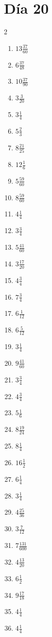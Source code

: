 \documentclass[12pt]{article}
\begin{document}
\section*{Día 20}
\begin{multicols}{2}\begin{enumerate}
\item $ 13 \frac{37}{60} $
\item $ 6 \frac{37}{48} $
\item $ 10 \frac{37}{90} $
\item $ 3 \frac{3}{20} $
\item $ 3 \frac{1}{4} $
\item $ 5 \frac{2}{3} $
\item $ 8 \frac{21}{25} $
\item $ 12 \frac{1}{6} $
\item $ 5 \frac{59}{60} $
\item $ 8 \frac{59}{60} $
\item $ 4 \frac{1}{4} $
\item $ 3 \frac{3}{4} $
\item $ 5 \frac{41}{60} $
\item $ 3 \frac{17}{20} $
\item $ 4 \frac{3}{4} $
\item $ 7 \frac{3}{4} $
\item $ 6 \frac{1}{12} $
\item $ 6 \frac{5}{12} $
\item $ 3 \frac{1}{4} $
\item $ 9 \frac{41}{60} $
\item $ 3 \frac{3}{4} $
\item $ 4 \frac{3}{4} $
\item $ 5 \frac{1}{6} $
\item $ 8 \frac{19}{24} $
\item $ 8 \frac{1}{4} $
\item $ 16 \frac{1}{2} $
\item $ 6 \frac{1}{4} $
\item $ 3 \frac{1}{4} $
\item $ 4 \frac{25}{36} $
\item $ 3 \frac{7}{12} $
\item $ 7 \frac{131}{600} $
\item $ 4 \frac{13}{20} $
\item $ 6 \frac{1}{2} $
\item $ 9 \frac{17}{18} $
\item $ 4 \frac{1}{4} $
\item $ 4 \frac{1}{4} $

\end{enumerate}
\end{multicols}
\end{document}

